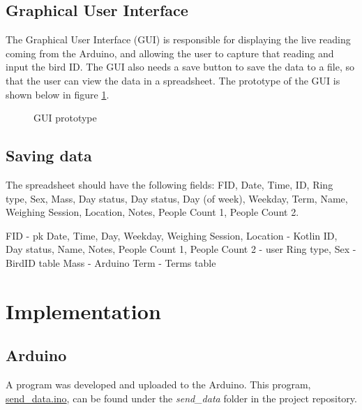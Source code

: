 \documentclass[class=report,11pt,crop=false]{standalone}
\begin{document}
		
		\subsection{Graphical User Interface}
		The Graphical User Interface (GUI) is responsible for displaying the live reading coming from the Arduino, and allowing the user to capture that reading and input the bird ID. The GUI also needs a save button to save the data to a file, so that the user can view the data in a spreadsheet.
		The prototype of the GUI is shown below in figure \ref{fig:gui-prototype}.
				
		\begin{figure}[h!]
			\centering
			\caption{GUI prototype}
			\label{fig:gui-prototype}
		\end{figure}
		
		\subsection{Saving data}
		
		
		The spreadsheet should have the following fields: FID, Date, Time, ID, Ring type, Sex, Mass, Day status, Day status, Day (of week), Weekday, Term, Name, Weighing Session, Location, Notes, People Count 1, People Count 2.
		
		FID - pk
		Date, Time, Day, Weekday, Weighing Session, Location - Kotlin
		ID, Day status, Name, Notes, People Count 1, People Count 2 - user
		Ring type, Sex - BirdID table
		Mass - Arduino
		Term - Terms table
		
	
	\section{Implementation}
	
		\subsection{Arduino}
		A program was developed and uploaded to the Arduino. This program, \href{https://github.com/karanimaan/EEE4113F-Project--Group-26/blob/main/send_data/send_data.ino}{send\_data.ino}, can be found under the \textit{send\_data} folder in the project repository.
	
\end{document}
